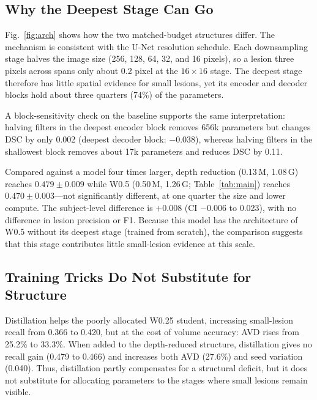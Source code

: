 \documentclass[conference]{IEEEtran}
\begin{document}
\subsection{Why the Deepest Stage Can Go}

Fig.~\ref{fig:arch} shows how the two matched-budget structures differ.
The mechanism is consistent with the U-Net resolution schedule. Each
downsampling stage halves the image size (256, 128, 64, 32, and
16 pixels), so a lesion three pixels across spans only about 0.2 pixel
at the $16\!\times\!16$ stage. The deepest stage therefore has little spatial
evidence for small lesions, yet its encoder and decoder blocks hold about three quarters (74\%) of
the parameters.

A block-sensitivity check on the baseline supports the same interpretation:
halving filters in the deepest encoder block removes 656k parameters but
changes DSC by only 0.002 (deepest decoder block: $-0.038$), whereas
halving filters in the shallowest block removes
about 17k parameters and reduces DSC by 0.11.

Compared against a model four times larger, depth reduction (0.13\,M,
1.08\,G) reaches $0.479 \pm 0.009$ while W0.5 (0.50\,M, 1.26\,G; Table~\ref{tab:main}) reaches
$0.470 \pm 0.003$---not significantly different, at one quarter the size
and lower compute. The subject-level difference is $+0.008$ (CI $-0.006$
to 0.023), with no difference in lesion precision or F1.
Because this model has the architecture of W0.5 without its deepest
stage (trained from scratch), the comparison suggests that this stage
contributes little small-lesion evidence at this scale.

\subsection{Training Tricks Do Not Substitute for Structure}\label{sec:tricks}

Distillation helps the poorly allocated W0.25 student, increasing
small-lesion recall from 0.366 to 0.420, but at the cost of volume
accuracy: AVD rises from 25.2\% to 33.3\%. When added to the
depth-reduced structure, distillation gives no recall gain (0.479 to
0.466) and increases both AVD (27.6\%) and seed variation (0.040). Thus,
distillation partly compensates for a structural deficit, but it does not
substitute for allocating parameters to the stages where small lesions
remain visible.
\end{document}
